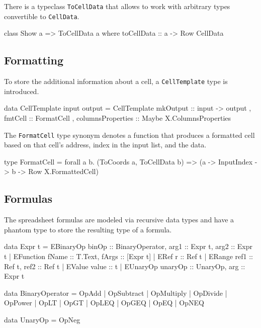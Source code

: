 There is a typeclass \texttt{ToCellData} that allows to work with arbitrary types convertible to \texttt{CellData}.

\begin{mycode}
  class Show a => ToCellData a where
  toCellData :: a -> Row CellData
\end{mycode}

\subsection{Formatting}
\label{sec:formatting}

To store the additional information about a cell, a \texttt{CellTemplate} type is introduced.

\begin{mycode}
  data CellTemplate input output = CellTemplate
    { mkOutput :: input -> output
      , fmtCell :: FormatCell
      , columnsProperties :: Maybe X.ColumnsProperties
    }
\end{mycode}

The \texttt{FormatCell} type synonym denotes a function that produces a formatted cell based on that cell's address, index in the input list, and the data.

\begin{mycode}
  type FormatCell =
  forall a b.
  (ToCoords a, ToCellData b) =>
  (a -> InputIndex -> b -> Row X.FormattedCell)
\end{mycode}

\subsection{Formulas}
\label{sec:formulas}

The spreadsheet formulas are modeled via recursive data types and have a phantom type to store the resulting type of a formula.

\begin{mycode}
  data Expr t
  = EBinaryOp {binOp :: BinaryOperator, arg1 :: Expr t, arg2 :: Expr t}
  | EFunction {fName :: T.Text, fArgs :: [Expr t]}
  | ERef {r :: Ref t}
  | ERange {ref1 :: Ref t, ref2 :: Ref t}
  | EValue {value :: t}
  | EUnaryOp {unaryOp :: UnaryOp, arg :: Expr t}

  data BinaryOperator
  = OpAdd
  | OpSubtract
  | OpMultiply
  | OpDivide
  | OpPower
  | OpLT
  | OpGT
  | OpLEQ
  | OpGEQ
  | OpEQ
  | OpNEQ

  data UnaryOp
  = OpNeg
\end{mycode}

